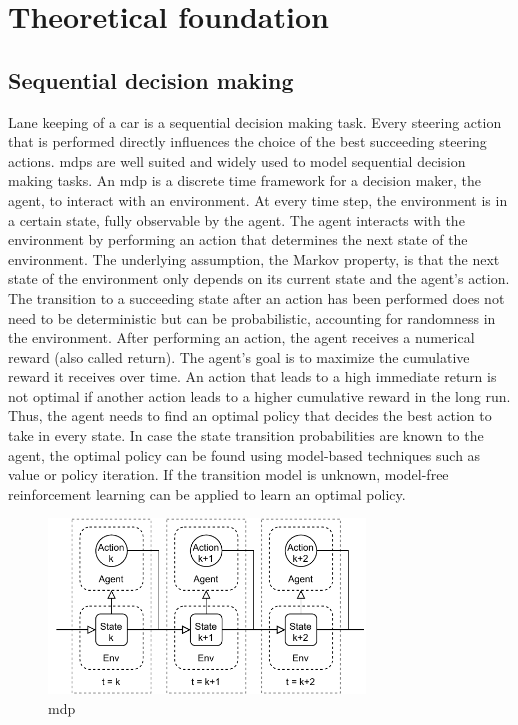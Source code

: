\chapter{Theoretical foundation}
\label{sec:theory}

\section{Sequential decision making}

Lane keeping of a car is a sequential decision making task. Every steering action that is performed directly influences the choice of the best succeeding steering actions. \Glspl{mdp} are well suited and widely used to model sequential decision making tasks. An \gls{mdp} is a discrete time framework for a decision maker, the agent, to interact with an environment. At every time step, the environment is in a certain state, fully observable by the agent. The agent interacts with the environment by performing an action that determines the next state of the environment. The underlying assumption, the Markov property, is that the next state of the environment only depends on its current state and the agent's action. The transition to a succeeding state after an action has been performed does not need to be deterministic but can be probabilistic, accounting for randomness in the environment. After performing an action, the agent receives a numerical reward (also called return). The agent's goal is to maximize the cumulative reward it receives over time. An action that leads to a high immediate return is not optimal if another action leads to a higher cumulative reward in the long run. Thus, the agent needs to find an optimal policy that decides the best action to take in every state. In case the state transition probabilities are known to the agent, the optimal policy can be found using model-based techniques such as value or policy iteration. If the transition model is unknown, model-free reinforcement learning can be applied to learn an optimal policy. %

\begin{figure}[htbp]
    \centering
    \includegraphics[width=0.75\textwidth]{figures/MDP.pdf}
    \caption{\acrfull{mdp}}
\end{figure}

